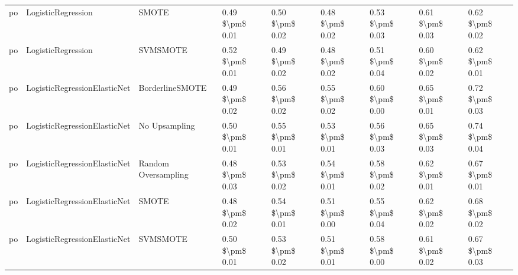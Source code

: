 \begin{tabular}{lllllllll}
      po &              LogisticRegression &                         SMOTE &     0.49 \$\textbackslash pm\$ 0.01 &           0.50 \$\textbackslash pm\$ 0.02 &       0.48 \$\textbackslash pm\$ 0.02 &        0.53 \$\textbackslash pm\$ 0.03 &                         0.61 \$\textbackslash pm\$ 0.03 &     0.62 \$\textbackslash pm\$ 0.02 \\
      po &              LogisticRegression &                      SVMSMOTE &     0.52 \$\textbackslash pm\$ 0.01 &           0.49 \$\textbackslash pm\$ 0.02 &       0.48 \$\textbackslash pm\$ 0.02 &        0.51 \$\textbackslash pm\$ 0.04 &                         0.60 \$\textbackslash pm\$ 0.02 &     0.62 \$\textbackslash pm\$ 0.01 \\
      po &    LogisticRegressionElasticNet &               BorderlineSMOTE &     0.49 \$\textbackslash pm\$ 0.02 &           0.56 \$\textbackslash pm\$ 0.02 &       0.55 \$\textbackslash pm\$ 0.02 &        0.60 \$\textbackslash pm\$ 0.00 &                         0.65 \$\textbackslash pm\$ 0.01 &     0.72 \$\textbackslash pm\$ 0.03 \\
      po &    LogisticRegressionElasticNet &                 No Upsampling &     0.50 \$\textbackslash pm\$ 0.01 &           0.55 \$\textbackslash pm\$ 0.01 &       0.53 \$\textbackslash pm\$ 0.01 &        0.56 \$\textbackslash pm\$ 0.03 &                         0.65 \$\textbackslash pm\$ 0.03 &     0.74 \$\textbackslash pm\$ 0.04 \\
      po &    LogisticRegressionElasticNet &           Random Oversampling &     0.48 \$\textbackslash pm\$ 0.03 &           0.53 \$\textbackslash pm\$ 0.02 &       0.54 \$\textbackslash pm\$ 0.01 &        0.58 \$\textbackslash pm\$ 0.02 &                         0.62 \$\textbackslash pm\$ 0.01 &     0.67 \$\textbackslash pm\$ 0.01 \\
      po &    LogisticRegressionElasticNet &                         SMOTE &     0.48 \$\textbackslash pm\$ 0.02 &           0.54 \$\textbackslash pm\$ 0.01 &       0.51 \$\textbackslash pm\$ 0.00 &        0.55 \$\textbackslash pm\$ 0.04 &                         0.62 \$\textbackslash pm\$ 0.02 &     0.68 \$\textbackslash pm\$ 0.02 \\
      po &    LogisticRegressionElasticNet &                      SVMSMOTE &     0.50 \$\textbackslash pm\$ 0.01 &           0.53 \$\textbackslash pm\$ 0.02 &       0.51 \$\textbackslash pm\$ 0.01 &        0.58 \$\textbackslash pm\$ 0.00 &                         0.61 \$\textbackslash pm\$ 0.02 &     0.67 \$\textbackslash pm\$ 0.03 \\

\end{tabular}
